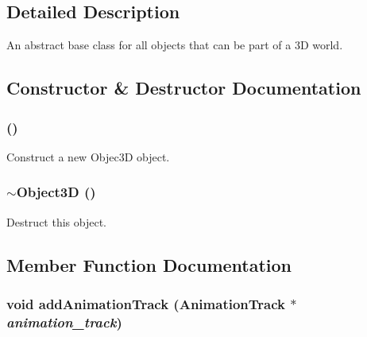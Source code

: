\subsection{Detailed Description}
An abstract base class for all objects that can be part of a 3D world. 

\subsection{Constructor \& Destructor Documentation}
\hypertarget{classm3g_1_1Object3D_f4b10c33b9014a3f0a675ef4b699b773}{
\subsubsection[{Object3D}]{ ()}}
\label{classm3g_1_1Object3D_f4b10c33b9014a3f0a675ef4b699b773}


Construct a new Objec3D object. \hypertarget{classm3g_1_1Object3D_8ece10725587e63a2c75283c16cc4df5}{
\subsubsection[{$\sim$Object3D}]{\setlength{\rightskip}{0pt plus 5cm}$\sim${\bf Object3D} ()}}
\label{classm3g_1_1Object3D_8ece10725587e63a2c75283c16cc4df5}


Destruct this object. 

\subsection{Member Function Documentation}
\hypertarget{classm3g_1_1Object3D_415c0b110f95410ded9b85e5d99a496b}{
\subsubsection[{addAnimationTrack}]{\setlength{\rightskip}{0pt plus 5cm}void addAnimationTrack ({\bf AnimationTrack} $\ast$ {\em animation\_\-track})}}
\label{classm3g_1_1Object3D_415c0b110f95410ded9b85e5d99a496b}


